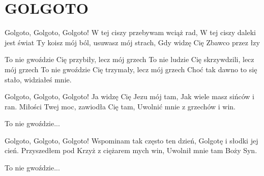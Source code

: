 \documentclass[../../../songbook.tex]{subfiles}
\begin{document}
\TabPositions{9cm} %
\section*{GOLGOTO}
{}
\vspace{0.5cm}
Golgoto, Golgoto, Golgoto!					 \newline
W tej ciszy przebywam wciąż rad,			 \newline
W tej ciszy daleki jest świat				 \newline
Ty koisz mój ból, usuwasz mój strach,		 \newline
Gdy widzę Cię Zbawco przez łzy				 \newline

\-\hspace{1cm} To nie gwoździe Cię przybiły, lecz mój grzech	 \newline
\-\hspace{1cm} To nie ludzie Cię skrzywdzili, lecz mój grzech	 \newline
\-\hspace{1cm} To nie gwoździe Cię trzymały, lecz mój grzech	 \newline
\-\hspace{1cm} Choć tak dawno to się stało, widziałeś mnie.		 \newline

Golgoto, Golgoto, Golgoto! \newline
Ja widzę Cię Jezu mój tam, \newline
Jak wiele masz sińców i ran. \newline
Miłości Twej moc, zawiodła Cię tam, \newline
Uwolnić mnie z grzechów i win. \newline

\-\hspace{1cm} To nie gwoździe... \newline

Golgoto, Golgoto, Golgoto! \newline
Wspominam tak często ten dzień, \newline
Golgotę i słodki jej cień. \newline
Przyszedłem pod Krzyż z ciężarem mych win, \newline
Uwolnił mnie tam Boży Syn. \newline

\-\hspace{1cm} To nie gwoździe... \newline
\end{document}
